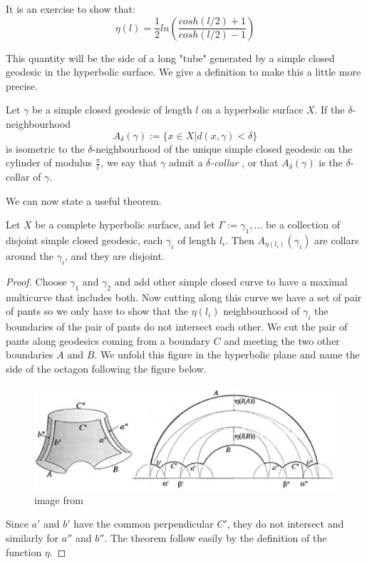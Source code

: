 



It is an exercise to show that:\[
\eta(l)= \frac{1}{2} ln(\frac{cosh(l/2)+1}{cosh(l/2)-1})
\]

This quantity will be the side of a long "tube" generated by a simple closed geodesic in the hyperbolic surface. We give a definition to make this a little more precise. %

\begin{dfnt}
Let $\gamma$ be a simple closed geodesic of length $l$ on a hyperbolic surface $X$. If the $\delta$-neighbourhood \[
A_\delta(\gamma):= \{ x \in X | d(x,\gamma) < \delta \}
\]
is isometric to the $\delta$-neighbourhood of the unique simple closed geodesic on the cylinder of modulus $\frac{\pi}{l}$, we say that $\gamma$ admit a \emph{$\delta$-collar}
, or that $A_\delta(\gamma)$ is the $\delta$-collar of $\gamma$.
\end{dfnt}

We can now state a useful theorem.

\begin{thm}\label{ColLem}
Let $X$ be a complete hyperbolic surface, and let $\Gamma:={\gamma_1,...}$ be a collection of disjoint simple closed geodesic, each $\gamma_i$ of length $l_i$. Then $A_{\eta(l_i)}(\gamma_i)$ are collars around the $\gamma_i$, and they are disjoint.
\end{thm}

\begin{proof}
Choose $\gamma_1$ and $\gamma_2$ and add other simple closed curve to have a maximal multicurve that includes both.
Now cutting along this curve we have a set of pair of pants so we only have to show that the $\eta(l_i)$ neighbourhood of $\gamma_i$ the boundaries of the pair of pants do not intersect each other. We cut the pair of pants along geodesics coming from a boundary $C$ and meeting the two other boundaries $A$ and $B$. We unfold this figure in the hyperbolic plane and name the side of the octagon following the figure below.

\begin{figure}[h!]
\centering
\includegraphics[width=12cm]{Image/CollarProof.jpg}
\caption{image from \cite{hubbardhal01297628}}
\end{figure}

Since $a'$ and $b'$ have the common perpendicular $C'$, they do not intersect and similarly for $a''$ and $b''$. The theorem follow easily by the definition of the function $\eta$.

\end{proof}

